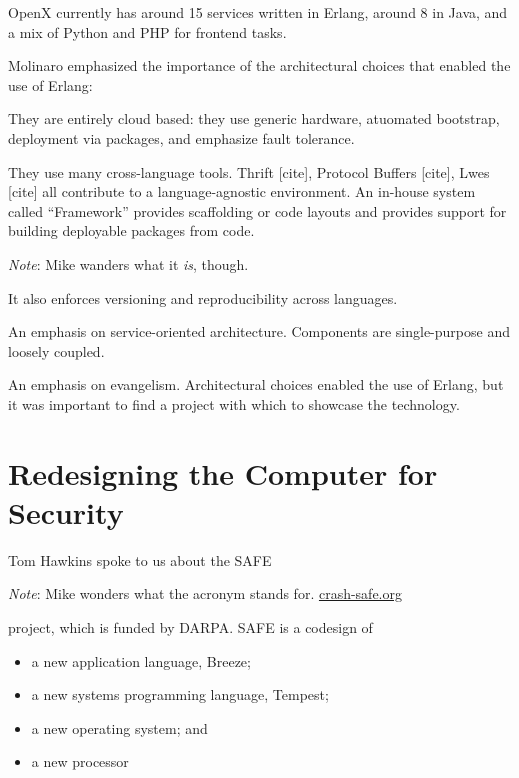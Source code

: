 \documentclass{jfp1}
\newenvironment{ipar}[0]%
 {\begin{list}{}%
 {\setlength{\leftmargin}{1cm}}%
\item[]%
 }
 {\end{list}}
\newcommand\needcite{{\color{red} [cite]}\xspace}
\newcommand{\note}[1]{ \begin{ipar}  {\color{Gray} \textit{Note}: #1} \end{ipar}}
\begin{document}
OpenX currently has around 15 services written in Erlang, around 8 in
Java, and a mix of Python and PHP for frontend tasks.

Molinaro emphasized the importance of the architectural choices that
enabled the use of Erlang:

\begin{itemize}

\item They are entirely cloud based: they use generic hardware,
atuomated bootstrap, deployment via packages, and emphasize fault
tolerance.

\item They use many cross-language tools. Thrift\needcite, Protocol
Buffers\needcite, Lwes\needcite all contribute to a language-agnostic
environment. An in-house system called ``Framework'' provides
scaffolding or code layouts and provides support for building
deployable packages from code.  \note{Mike wanders what it \emph{is},
  though.}
It also enforces versioning and
reproducibility across languages.

\item An emphasis on service-oriented architecture. Components are
single-purpose and loosely coupled.

\item An emphasis on evangelism. Architectural choices enabled the use
of Erlang, but it was important to find a project with which to
showcase the technology.

\end{itemize}

\section{Redesigning the Computer for Security}


Tom Hawkins spoke to us about the SAFE \note{Mike wonders what the
  acronym stands for. \url{crash-safe.org}}  project, which is funded
by DARPA. SAFE is a codesign of 

\begin{itemize}
\item a new application language, Breeze;
\item a new systems programming language, Tempest;
\item a new operating system; and
\item a new processor 
\end{itemize}
\end{document}
